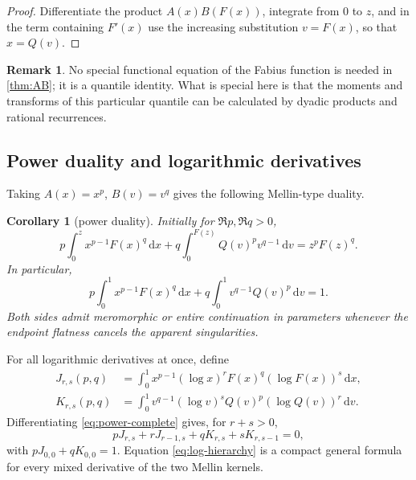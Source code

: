\documentclass[11pt,oneside]{article}
\newtheorem{corollary}[theorem]{Corollary}
\theoremstyle{definition}
\newtheorem{remark}[theorem]{Remark}
\newcommand{\F}{F}
\newcommand{\Q}{Q}
\newcommand{\dd}{\,\mathrm d}
\begin{document}
\begin{proof}
Differentiate the product \(A(x)B(\F(x))\), integrate from \(0\) to \(z\), and in
the term containing \(\F'(x)\) use the increasing substitution \(v=\F(x)\),
so that \(x=\Q(v)\).
\end{proof}

\begin{remark}
No special functional equation of the Fabius function is needed in
\cref{thm:AB}; it is a quantile identity.  What is special here is that the moments and
transforms of this particular quantile can be calculated by dyadic products and rational
recurrences.
\end{remark}

\subsection{Power duality and logarithmic derivatives}

Taking \(A(x)=x^p\), \(B(v)=v^q\) gives the following Mellin-type duality.

\begin{corollary}[power duality]\label{cor:power-duality}
Initially for \(\Re p,\Re q>0\),
\begin{equation}\label{eq:power-incomplete}
 p\int_0^z x^{p-1}\F(x)^q\dd x
 +q\int_0^{\F(z)}\Q(v)^p v^{q-1}\dd v
 =z^p\F(z)^q.
\end{equation}
In particular,
\begin{equation}\label{eq:power-complete}
 p\int_0^1x^{p-1}\F(x)^q\dd x
 +q\int_0^1v^{q-1}\Q(v)^p\dd v=1.
\end{equation}
Both sides admit meromorphic or entire continuation in parameters whenever the endpoint
flatness cancels the apparent singularities.
\end{corollary}

For all logarithmic derivatives at once, define
\begin{align}
 J_{r,s}(p,q)&=\int_0^1x^{p-1}(\log x)^r\F(x)^q(\log\F(x))^s\dd x,\label{eq:Jrs}\\
 K_{r,s}(p,q)&=\int_0^1v^{q-1}(\log v)^s\Q(v)^p(\log\Q(v))^r\dd v.\label{eq:Krs}
\end{align}
Differentiating \cref{eq:power-complete} gives, for \(r+s>0\),
\begin{equation}\label{eq:log-hierarchy}
 pJ_{r,s}+rJ_{r-1,s}+qK_{r,s}+sK_{r,s-1}=0,
\end{equation}
with \(pJ_{0,0}+qK_{0,0}=1\).  Equation \cref{eq:log-hierarchy} is a compact
general formula for every mixed derivative of the two Mellin kernels.
\end{document}
